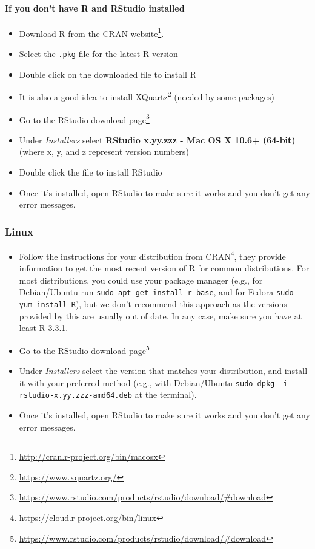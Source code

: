 \documentclass[
  12pt,
]{book}
\newcommand{\passthrough}[1]{#1}
\providecommand{\tightlist}{%
  \setlength{\itemsep}{0pt}\setlength{\parskip}{0pt}}
\renewcommand{\href}[2]{#2\footnote{\url{#1}}}
\theoremstyle{definition}
\theoremstyle{definition}
\theoremstyle{definition}
\newcommand{\1}{\mathbbm{1}}
\begin{document}
\hypertarget{if-you-dont-have-r-and-rstudio-installed-1}{%
\paragraph{If you don't have R and RStudio installed}\label{if-you-dont-have-r-and-rstudio-installed-1}}

\begin{itemize}
\tightlist
\item
  Download R from
  the \href{http://cran.r-project.org/bin/macosx}{CRAN website}.
\item
  Select the \passthrough{\lstinline!.pkg!} file for the latest R version
\item
  Double click on the downloaded file to install R
\item
  It is also a good idea to install \href{https://www.xquartz.org/}{XQuartz} (needed
  by some packages)
\item
  Go to the \href{https://www.rstudio.com/products/rstudio/download/\#download}{RStudio download
  page}
\item
  Under \emph{Installers} select \textbf{RStudio x.yy.zzz - Mac OS X 10.6+ (64-bit)}
  (where x, y, and z represent version numbers)
\item
  Double click the file to install RStudio
\item
  Once it's installed, open RStudio to make sure it works and you don't get any
  error messages.
\end{itemize}

\hypertarget{linux}{%
\subsubsection{Linux}\label{linux}}

\begin{itemize}
\tightlist
\item
  Follow the instructions for your distribution
  from \href{https://cloud.r-project.org/bin/linux}{CRAN}, they provide information
  to get the most recent version of R for common distributions. For most
  distributions, you could use your package manager (e.g., for Debian/Ubuntu run
  \passthrough{\lstinline!sudo apt-get install r-base!}, and for Fedora \passthrough{\lstinline!sudo yum install R!}), but we
  don't recommend this approach as the versions provided by this are
  usually out of date. In any case, make sure you have at least R 3.3.1.
\item
  Go to the \href{https://www.rstudio.com/products/rstudio/download/\#download}{RStudio download
  page}
\item
  Under \emph{Installers} select the version that matches your distribution, and
  install it with your preferred method (e.g., with Debian/Ubuntu \passthrough{\lstinline!sudo dpkg -i rstudio-x.yy.zzz-amd64.deb!} at the terminal).
\item
  Once it's installed, open RStudio to make sure it works and you don't get any
  error messages.
\end{itemize}
\end{document}
